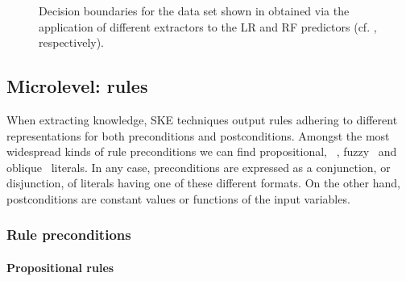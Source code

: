 \documentclass[sigconf]{acmart}
\begin{document}
\begin{figure}[p]
{	}
	\caption{Decision boundaries for the data set shown in  obtained via the application of different extractors to the LR and RF predictors (cf. , respectively).}\label{fig:experiments}
\end{figure}

\subsection{Microlevel: rules}

When extracting knowledge, SKE techniques output rules adhering to different representations for both preconditions and postconditions.
%
Amongst the most widespread kinds of rule preconditions we can find propositional, \mofn{}~\cite{TowellS91,murphy1991id2}, fuzzy~\cite{HorikawaFU92,Berenji91} and oblique~\cite{Setiono00,SetionoL97} literals.
%
In any case, preconditions are expressed as a conjunction, or disjunction, of literals having one of these different formats.
%
On the other hand, postconditions are constant values or functions of the input variables.

\subsubsection{Rule preconditions}

\paragraph{Propositional rules}
\end{document}
